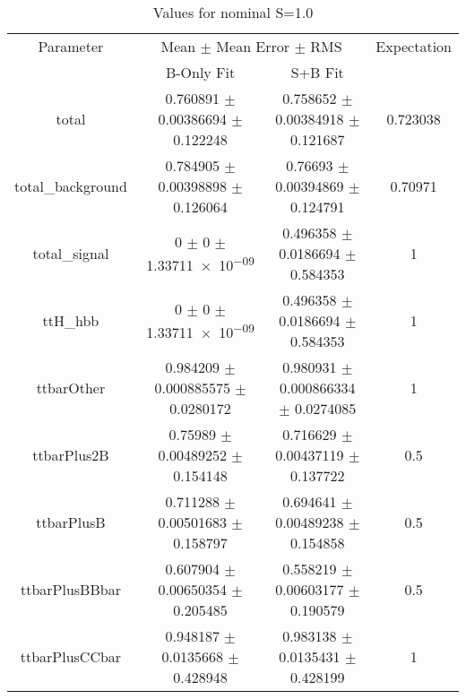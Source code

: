 \begin{table}
\centering
\caption{Values for nominal S=1.0}
\begin{tabular}{cccc}
\toprule
Parameter & \multicolumn{2}{c}{Mean $\pm$ Mean Error $\pm$ RMS} & Expectation\\
 & B-Only Fit & S+B Fit & \\
\midrule
total & \num{0.760891} $\pm$ \num{0.00386694} $\pm$ \num{0.122248} & \num{0.758652} $\pm$ \num{0.00384918} $\pm$ \num{0.121687} & \num{0.723038}\\
total\_background & \num{0.784905} $\pm$ \num{0.00398898} $\pm$ \num{0.126064} & \num{0.76693} $\pm$ \num{0.00394869} $\pm$ \num{0.124791} & \num{0.70971}\\
total\_signal & \num{0} $\pm$ \num{0} $\pm$ \num{1.33711e-09} & \num{0.496358} $\pm$ \num{0.0186694} $\pm$ \num{0.584353} & \num{1}\\
ttH\_hbb & \num{0} $\pm$ \num{0} $\pm$ \num{1.33711e-09} & \num{0.496358} $\pm$ \num{0.0186694} $\pm$ \num{0.584353} & \num{1}\\
ttbarOther & \num{0.984209} $\pm$ \num{0.000885575} $\pm$ \num{0.0280172} & \num{0.980931} $\pm$ \num{0.000866334} $\pm$ \num{0.0274085} & \num{1}\\
ttbarPlus2B & \num{0.75989} $\pm$ \num{0.00489252} $\pm$ \num{0.154148} & \num{0.716629} $\pm$ \num{0.00437119} $\pm$ \num{0.137722} & \num{0.5}\\
ttbarPlusB & \num{0.711288} $\pm$ \num{0.00501683} $\pm$ \num{0.158797} & \num{0.694641} $\pm$ \num{0.00489238} $\pm$ \num{0.154858} & \num{0.5}\\
ttbarPlusBBbar & \num{0.607904} $\pm$ \num{0.00650354} $\pm$ \num{0.205485} & \num{0.558219} $\pm$ \num{0.00603177} $\pm$ \num{0.190579} & \num{0.5}\\
ttbarPlusCCbar & \num{0.948187} $\pm$ \num{0.0135668} $\pm$ \num{0.428948} & \num{0.983138} $\pm$ \num{0.0135431} $\pm$ \num{0.428199} & \num{1}\\
\bottomrule
\end{tabular}
\end{table}